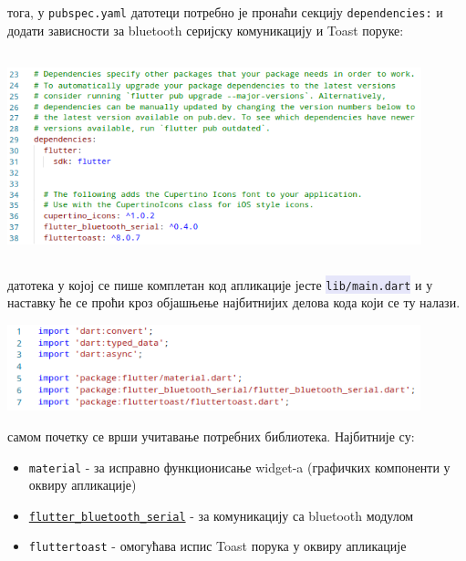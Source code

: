 \documentclass[12pt]{article}
\newcommand{\mycode}[1]{\texttt{\colorbox{Lavender}{#1}}}
\begin{document}
\indent{} тога, у \texttt{pubspec.yaml} датотеци потребно је пронаћи секцију \texttt{dependencies:} и додати зависности за bluetooth серијску комуникацију и Toast поруке:
\begin{center}
    \centering 
    \includegraphics[height=6cm, width=12cm]{images/dependencies}
\end{center}
\vspace{0.3cm}
\indent{} датотека у којој се пише комплетан код апликације јесте \mycode{lib/main.dart} и у наставку ће се проћи кроз објашњење најбитнијих делова кода који се ту налази.
\begin{center}
    \centering 
    \includegraphics[height=2.5cm, width=12cm]{images/dart1}
\end{center}
\indent{} самом почетку се врши учитавање потребних библиотека. Најбитније су:
\begin{itemize}
    \item \texttt{material} - за исправно функционисање widget-a (графичких компоненти у оквиру апликације)
    \item \href{https://pub.dev/packages/flutter\_bluetooth\_serial}{\texttt{flutter\_bluetooth\_serial}} - за комуникацију са bluetooth модулом
    \item \texttt{fluttertoast} - омогућава испис Toast порука у оквиру апликације
\end{itemize}
\end{document}
